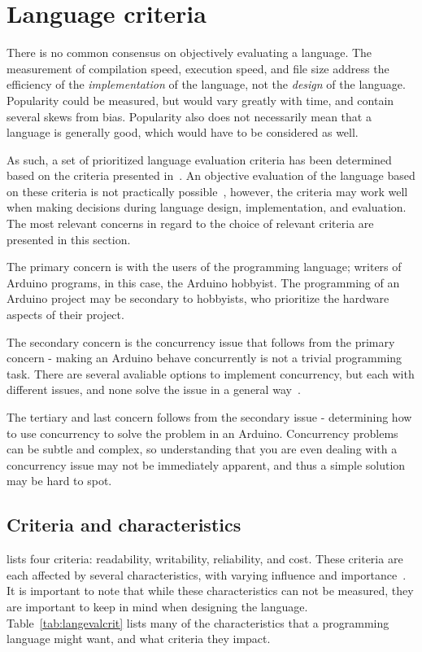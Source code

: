 \section{Language criteria}\label{sec:languageeval}
There is no common consensus on objectively evaluating a language. The measurement of compilation speed, execution speed, and file size address the efficiency of the \textit{implementation} of the language, not the \textit{design} of the language. Popularity could be measured, but would vary greatly with time, and contain several skews from bias. Popularity also does not necessarily mean that a language is generally good, which would have to be considered as well.

As such, a set of prioritized language evaluation criteria has been determined based on the criteria presented in~\cite{Sebesta2016}. An objective evaluation of the language based on these criteria is not practically possible~\cite{Sebesta2016}, however, the criteria may work well when making decisions during language design, implementation, and evaluation. The most relevant concerns in regard to the choice of relevant criteria are presented in this section.

The primary concern is with the users of the programming language; writers of Arduino programs, in this case, the Arduino hobbyist. The programming of an Arduino project may be secondary to hobbyists, who prioritize the hardware aspects of their project.

The secondary concern is the concurrency issue that follows from the primary concern - making an Arduino behave concurrently is not a trivial programming task. There are several avaliable options to implement concurrency, but each with different issues, and none solve the issue in a general way~\cite{Restucia2022}.

The tertiary and last concern follows from the secondary issue - determining how to use concurrency to solve the problem in an Arduino. Concurrency problems can be subtle and complex, so understanding that you are even dealing with a concurrency issue may not be immediately apparent, and thus a simple solution may be hard to spot.

\subsection{Criteria and characteristics}\label{subsec:priorityofcriteria}
 lists four criteria: readability, writability, reliability, and cost. These criteria are each affected by several characteristics, with varying influence and importance~\cite{Sebesta2016}. It is important to note that while these characteristics can not be measured, they are important to keep in mind when designing the language. Table~\ref{tab:langevalcrit} lists many of the characteristics that a programming language might want, and what criteria they impact.


